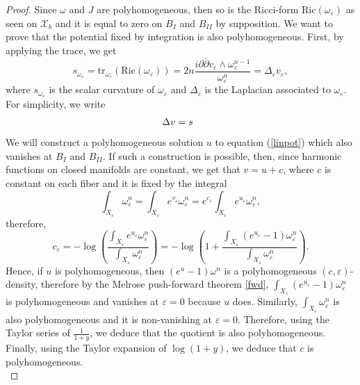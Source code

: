 \documentclass[a4paper,11pt]{article}
\begin{document}
     \begin{proof}
       Since $\omega$ and $J$ are polyhomogeneous, then so is the Ricci-form $\mathrm{Ric}(\omega_\varepsilon)$ as seen on $\mathcal{X}_b$ and it is equal to zero on $B_{I}$ and $B_{II}$ by supposition. We want to prove that the potential fixed by integration is also polyhomogeneous. First, by applying the trace, we get 
       $$
       s_{\omega_\varepsilon} = \mathrm{tr}_{\omega_\varepsilon}(\mathrm{Ric}(\omega_\varepsilon)) = 2n \frac{i \partial \overline{\partial}v_\varepsilon \wedge \omega_\varepsilon^{n-1}}{\omega_\varepsilon^{n}} = \Delta_\varepsilon v_\varepsilon,
       $$
       where $s_{\omega_\varepsilon}$ is the scalar curvature of $\omega_\varepsilon$ and $\Delta_\varepsilon$ is the Laplacian associated to $\omega_\varepsilon$. For simplicity, we write
 \begin{align} \label{linpot}
       \Delta v = s \hspace{0.1cm} \hspace{0.1cm}   
\end{align}
    We will construct a polyhomogeneous solution $u$ to equation (\ref{linpot}) which also vanishes at $B_{I}$ and $B_{II}$. If such a construction is possible, then, since harmonic functions on closed manifolds are constant, we get that $v = u + c$, where $c$ is constant on each fiber and it is fixed by the integral
    $$
    \int_{X_\varepsilon} \omega_\varepsilon^n = \int_{X_\varepsilon} e^{v_\varepsilon} \omega_\varepsilon^n = e^{c_\varepsilon}\int_{X_\varepsilon} e^{u_\varepsilon}\omega_\varepsilon^n,
    $$
    therefore,
    $$
    c_\varepsilon = - \log \left( \frac{\int_{X_\varepsilon} e^{u_\varepsilon} \omega_\varepsilon^n}{\int_{X_\varepsilon} \omega_\varepsilon^n} \right) = - \log \left( 1 + \frac{\int_{X_\varepsilon} \left(e^{u_\varepsilon} -1 \right)\omega_\varepsilon^n}{\int_{X_\varepsilon} \omega_\varepsilon^n} \right).
    $$
    Hence, if $u$ is polyhomogeneous, then $\left(e^{u} -1 \right)\omega^n$ is a polyhomogeneous $(c,\varepsilon)$-density, therefore by the Melrose push-forward theorem \ref{fwd}, $\int_{X_\varepsilon} \left(e^{u_\varepsilon} -1 \right)\omega_\varepsilon^n$ is polyhomogeneous and vanishes at $\varepsilon = 0$ because $u$ does. Similarly, $\int_{X_\varepsilon} \omega_\varepsilon^n$ is also polyhomogeneous and it is non-vanishing at $\varepsilon = 0$. Therefore, using the Taylor series of $\frac{1}{1+y}$, we deduce that the quotient is also polyhomogeneous. Finally, using the Taylor expansion of $\log (1+y)$, we deduce that $c$ is polyhomogeneous.\\
    

\end{proof}
\end{document}
